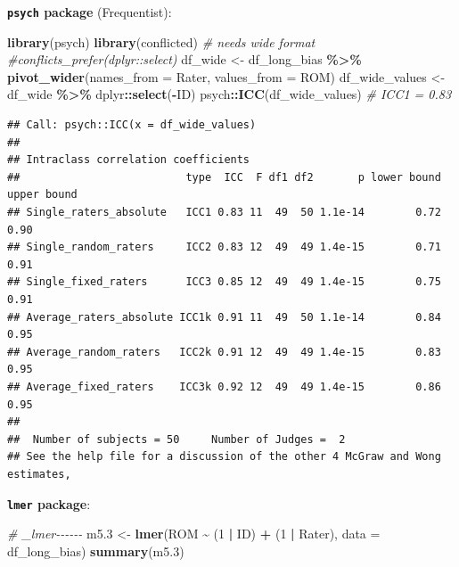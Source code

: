 \documentclass[
]{article}
\newenvironment{Shaded}{\begin{snugshade}}{\end{snugshade}}
\newcommand{\AttributeTok}[1]{\textcolor[rgb]{0.13,0.29,0.53}{#1}}
\newcommand{\CommentTok}[1]{\textcolor[rgb]{0.56,0.35,0.01}{\textit{#1}}}
\newcommand{\DecValTok}[1]{\textcolor[rgb]{0.00,0.00,0.81}{#1}}
\newcommand{\FloatTok}[1]{\textcolor[rgb]{0.00,0.00,0.81}{#1}}
\newcommand{\FunctionTok}[1]{\textcolor[rgb]{0.13,0.29,0.53}{\textbf{#1}}}
\newcommand{\NormalTok}[1]{#1}
\newcommand{\OtherTok}[1]{\textcolor[rgb]{0.56,0.35,0.01}{#1}}
\newcommand{\SpecialCharTok}[1]{\textcolor[rgb]{0.81,0.36,0.00}{\textbf{#1}}}
\begin{document}
\textbf{\texttt{psych} package} (Frequentist):

\begin{Shaded}
\begin{Highlighting}[]
\FunctionTok{library}\NormalTok{(psych)}
\FunctionTok{library}\NormalTok{(conflicted)}
\CommentTok{\# needs wide format}
\CommentTok{\#conflicts\_prefer(dplyr::select)}
\NormalTok{df\_wide }\OtherTok{\textless{}{-}}\NormalTok{ df\_long\_bias }\SpecialCharTok{\%\textgreater{}\%}
  \FunctionTok{pivot\_wider}\NormalTok{(}\AttributeTok{names\_from =}\NormalTok{ Rater, }\AttributeTok{values\_from =}\NormalTok{ ROM)}
\NormalTok{df\_wide\_values }\OtherTok{\textless{}{-}}\NormalTok{ df\_wide }\SpecialCharTok{\%\textgreater{}\%}\NormalTok{ dplyr}\SpecialCharTok{::}\FunctionTok{select}\NormalTok{(}\SpecialCharTok{{-}}\NormalTok{ID)}
\NormalTok{psych}\SpecialCharTok{::}\FunctionTok{ICC}\NormalTok{(df\_wide\_values) }\CommentTok{\# ICC1 = 0.83}
\end{Highlighting}
\end{Shaded}

\begin{verbatim}
## Call: psych::ICC(x = df_wide_values)
## 
## Intraclass correlation coefficients 
##                          type  ICC  F df1 df2       p lower bound upper bound
## Single_raters_absolute   ICC1 0.83 11  49  50 1.1e-14        0.72        0.90
## Single_random_raters     ICC2 0.83 12  49  49 1.4e-15        0.71        0.91
## Single_fixed_raters      ICC3 0.85 12  49  49 1.4e-15        0.75        0.91
## Average_raters_absolute ICC1k 0.91 11  49  50 1.1e-14        0.84        0.95
## Average_random_raters   ICC2k 0.91 12  49  49 1.4e-15        0.83        0.95
## Average_fixed_raters    ICC3k 0.92 12  49  49 1.4e-15        0.86        0.95
## 
##  Number of subjects = 50     Number of Judges =  2
## See the help file for a discussion of the other 4 McGraw and Wong estimates,
\end{verbatim}

\textbf{\texttt{lmer} package}:

\begin{Shaded}
\begin{Highlighting}[]
\CommentTok{\# \_lmer{-}{-}{-}{-}{-}{-}}
\NormalTok{m5}\FloatTok{.3} \OtherTok{\textless{}{-}} \FunctionTok{lmer}\NormalTok{(ROM }\SpecialCharTok{\textasciitilde{}}\NormalTok{ (}\DecValTok{1} \SpecialCharTok{|}\NormalTok{ ID) }\SpecialCharTok{+}\NormalTok{ (}\DecValTok{1} \SpecialCharTok{|}\NormalTok{ Rater), }\AttributeTok{data =}\NormalTok{ df\_long\_bias)}
\FunctionTok{summary}\NormalTok{(m5}\FloatTok{.3}\NormalTok{)}
\end{Highlighting}
\end{Shaded}
\end{document}
